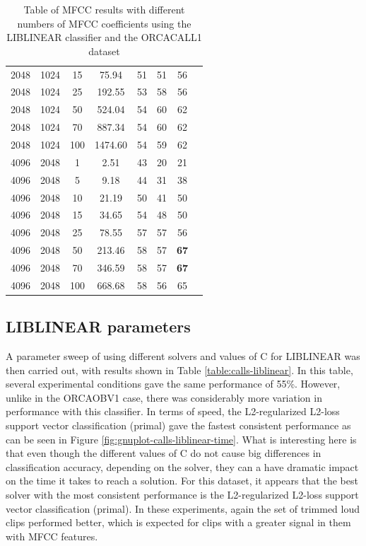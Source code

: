 \begin{table}
\begin{tabular}{|c|c|c|c|c|c|c|c}
2048 & 1024 & 15   &        75.94  &    51 &  51  &  56 \\
2048 & 1024 & 25   &       192.55  &    53 &  58  &  56 \\
2048 & 1024 & 50   &       524.04  &    54 &  60  &  62 \\
2048 & 1024 & 70   &       887.34  &    54 &  60  &  62 \\
2048 & 1024 & 100  &      1474.60  &    54 &  59  &  62 \\
\hline
4096 & 2048 & 1    &         2.51  &    43 &  20  &  21 \\
4096 & 2048 & 5    &         9.18  &    44 &  31  &  38 \\
4096 & 2048 & 10   &        21.19  &    50 &  41  &  50 \\
4096 & 2048 & 15   &        34.65  &    54 &  48  &  50 \\
4096 & 2048 & 25   &        78.55  &    57 &  57  &  56 \\
4096 & 2048 & 50   &       213.46  &    58 &  57  &  \textbf{67} \\
4096 & 2048 & 70   &       346.59  &    58 &  57  &  \textbf{67} \\
4096 & 2048 & 100  &       668.68  &    58 &  56  &  65 \\
\hline
\end{tabular}
\caption{Table of MFCC results with different numbers of MFCC
  coefficients using the LIBLINEAR classifier and the ORCACALL1 dataset}
\label{table:calls-numMfccs}
\end{table}

%
%
\subsection{LIBLINEAR parameters}

A parameter sweep of using different solvers and values of C for
LIBLINEAR was then carried out, with results shown in Table
\ref{table:calls-liblinear}.  In this table, several experimental
conditions gave the same performance of 55\%.  However, unlike in the
ORCAOBV1 case, there was considerably more variation in performance
with this classifier.  In terms of speed, the L2-regularized L2-loss
support vector classification (primal) gave the fastest consistent
performance as can be seen in Figure
\ref{fig:gnuplot-calls-liblinear-time}.  What is interesting here is
that even though the different values of C do not cause big
differences in classification accuracy, depending on the solver, they
can a have dramatic impact on the time it takes to reach a solution.
For this dataset, it appears that the best solver with the most
consistent performance is the L2-regularized L2-loss support vector
classification (primal).  In these experiments, again the set of
trimmed loud clips performed better, which is expected for clips with
a greater signal in them with MFCC features.

